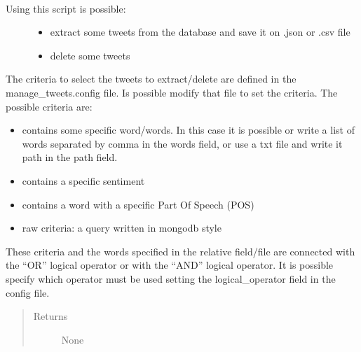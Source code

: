 \documentclass[letterpaper,10pt,english]{sphinxmanual}
\begin{document}
\begin{fulllineitems}
\label{\detokenize{code_comment/manage_tweets:script.manage_tweets.manage_tweets.main}}~\begin{description}
\item[{Using this script is possible:}] \leavevmode\begin{itemize}
\item {} 
\sphinxAtStartPar
extract some tweets from the database and save it on .json or .csv file

\item {} 
\sphinxAtStartPar
delete some tweets

\end{itemize}

\end{description}

\sphinxAtStartPar
The criteria to select the tweets to extract/delete are defined in the manage\_tweets.config file.
Is possible modify that file to set the criteria.
The possible criteria are:
\begin{itemize}
\item {} 
\sphinxAtStartPar
contains some specific word/words. In this case it is possible or write a list of words separated by comma in the words field, or use a txt file and write it path in the path field.

\item {} 
\sphinxAtStartPar
contains a specific sentiment

\item {} 
\sphinxAtStartPar
contains a word with a specific Part Of Speech (POS)

\item {} 
\sphinxAtStartPar
raw criteria: a query written in mongodb style

\end{itemize}

\sphinxAtStartPar
These criteria and the words specified in the relative field/file are connected with the “OR” logical operator
or with the “AND” logical operator. It is possible specify which operator must be used setting the logical\_operator field in the config file.
\begin{quote}\begin{description}
\item[{Returns}] \leavevmode
\sphinxAtStartPar
None

\end{description}\end{quote}

\end{fulllineitems}
\end{document}
